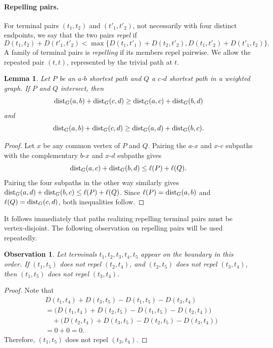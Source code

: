 \documentclass[11pt]{article}
\newtheorem{observation}[theorem]{Observation}
\newtheorem{lemma}[theorem]{Lemma}
\newcommand{\dist}{\textnormal{dist}}
\begin{document}
\paragraph{Repelling pairs.}
For terminal pairs $(t_1,t_2)$ and $(t'_1,t'_2)$, not necessarily with four distinct endpoints, we say that the two pairs \emph{repel} if
\[
D(t_1,t_2)+D(t'_1,t'_2)<
\max\{D(t_1,t'_1)+D(t_2,t'_2),D(t_1,t'_2)+D(t'_1,t_2)\}.
\]
A family of terminal pairs is \emph{repelling} if its members repel pairwise. We allow the repeated pair $(t,t)$, represented by the trivial path at $t$.

\begin{lemma}\label{lem: intersecting shortest paths}
Let $P$ be an $a$-$b$ shortest path and $Q$ a $c$-$d$ shortest path in a weighted graph. If $P$ and $Q$ intersect, then
\[
\dist_G(a,b)+\dist_G(c,d)\ge \dist_G(a,c)+\dist_G(b,d)
\]
and
\[
\dist_G(a,b)+\dist_G(c,d)\ge \dist_G(a,d)+\dist_G(b,c).
\]
\end{lemma}

\begin{proof}
Let $x$ be any common vertex of $P$ and $Q$. Pairing the $a$-$x$ and $x$-$c$ subpaths with the complementary $b$-$x$ and $x$-$d$ subpaths gives
\[
\dist_G(a,c)+\dist_G(b,d)\le \ell(P)+\ell(Q).
\]
Pairing the four subpaths in the other way similarly gives $\dist_G(a,d)+\dist_G(b,c)\le \ell(P)+\ell(Q)$. Since $\ell(P)=\dist_G(a,b)$ and $\ell(Q)=\dist_G(c,d)$, both inequalities follow.
\end{proof}

It follows immediately that paths realizing repelling terminal pairs must be vertex-disjoint. The following observation on repelling pairs will be used repeatedly.

\begin{observation}\label{lem: W-repel}
Let terminals $t_1,t_2,t_3,t_4,t_5$ appear on the boundary in this order. If $(t_1,t_5)$ does not repel $(t_2,t_4)$, and $(t_2,t_5)$ does not repel $(t_3,t_4)$, then $(t_1,t_5)$ does not repel $(t_3,t_4)$.
\end{observation}

\begin{proof}
Note that
\begin{align*}
&D(t_1,t_4)+D(t_3,t_5)-D(t_1,t_5)-D(t_3,t_4)\\
&=\bigl(D(t_1,t_4)+D(t_2,t_5)-D(t_1,t_5)-D(t_2,t_4)\bigr)\\
&\quad+\bigl(D(t_2,t_4)+D(t_3,t_5)-D(t_2,t_5)-D(t_3,t_4)\bigr)\\
&=0+0=0.
\end{align*}
Therefore, $(t_1,t_5)$ does not repel $(t_3,t_4)$.
\end{proof}
\end{document}

